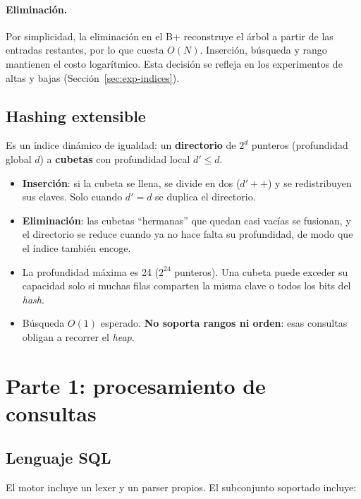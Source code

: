 \documentclass[11pt,a4paper]{article}
\begin{document}
\paragraph{Eliminación.} Por simplicidad, la eliminación en el B+ reconstruye el árbol a partir de las entradas restantes, por lo que cuesta $O(N)$. Inserción, búsqueda y rango mantienen el costo logarítmico. Esta decisión se refleja en los experimentos de altas y bajas (Sección~\ref{sec:exp-indices}).

\subsection{Hashing extensible}

Es un índice dinámico de igualdad: un \textbf{directorio} de $2^{d}$ punteros (profundidad global $d$) a \textbf{cubetas} con profundidad local $d' \le d$.

\begin{itemize}
  \item \textbf{Inserción}: si la cubeta se llena, se divide en dos ($d'{+}{+}$) y se redistribuyen sus claves. Solo cuando $d' = d$ se duplica el directorio.
  \item \textbf{Eliminación}: las cubetas ``hermanas'' que quedan casi vacías se fusionan, y el directorio se reduce cuando ya no hace falta su profundidad, de modo que el índice también encoge.
  \item La profundidad máxima es 24 ($2^{24}$ punteros). Una cubeta puede exceder su capacidad solo si muchas filas comparten la misma clave o todos los bits del \emph{hash}.
  \item Búsqueda $O(1)$ esperado. \textbf{No soporta rangos ni orden}: esas consultas obligan a recorrer el \emph{heap}.
\end{itemize}

\section{Parte 1: procesamiento de consultas}

\subsection{Lenguaje SQL}

El motor incluye un lexer y un parser propios. El subconjunto soportado incluye:
\end{document}
